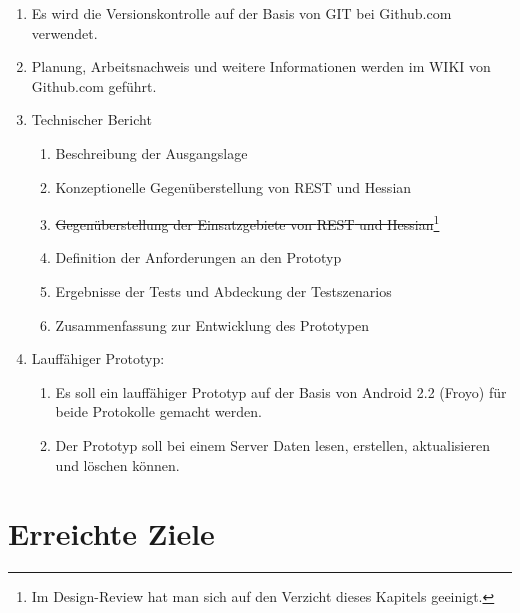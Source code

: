 \documentclass[listof=totocnumbered, bibliography=totocnumbered]{scrreprt}
\begin{document}
  \begin{enumerate}
    \item Es wird die Versionskontrolle auf der Basis von GIT bei
          Github.com verwendet.
    \item Planung, Arbeitsnachweis und weitere Informationen werden im WIKI
          von Github.com geführt.
    \item Technischer Bericht
    \begin{enumerate}
      \item Beschreibung der Ausgangslage
      \item Konzeptionelle Gegenüberstellung von \ac{REST} und Hessian
      \item \sout{Gegenüberstellung der Einsatzgebiete von \ac{REST} und
      Hessian}\footnote[4]{
        Im Design-Review hat man sich auf den Verzicht dieses Kapitels
        geeinigt.}
      \item Definition der Anforderungen an den Prototyp 
      \item Ergebnisse der Tests und Abdeckung der Testszenarios
      \item Zusammenfassung zur Entwicklung des Prototypen
    \end{enumerate}
    \item Lauffähiger Prototyp:
    \begin{enumerate}
      \item Es soll ein lauffähiger Prototyp auf der Basis von
            Android 2.2 (Froyo) für beide Protokolle gemacht werden.
      \item Der Prototyp soll bei einem Server Daten lesen, erstellen,
            aktualisieren und löschen können.
    \end{enumerate}
  \end{enumerate}
  
  \newpage  
  
  \section{Erreichte Ziele}
  
\end{document}
